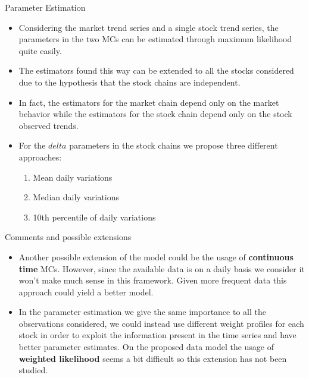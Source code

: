 \documentclass{beamer}
\begin{document}
	\begin{frame}{Parameter Estimation}
	\begin{itemize}
		\item Considering the market trend series and a single stock trend series, the parameters in the two MCs can be estimated through maximum likelihood quite easily.
		\item The estimators found this way can be extended to all the stocks considered due to the hypothesis that the stock chains are independent.
		\item In fact, the estimators for the market chain depend only on the market behavior while the estimators for the stock chain depend only on the stock observed trends.
		\item For the $delta$ parameters in the stock chains we propose three different approaches:
			\begin{enumerate}
				\item Mean daily variations
				\item Median daily variations
				\item 10th percentile of daily variations
			\end{enumerate}
	\end{itemize}
	\end{frame}

	\begin{frame}{Comments and possible extensions}
	\begin{itemize}
		\item Another possible extension of the model could be the usage of \textbf{continuous time} MCs. However, since the available data is on a daily basis we consider it won't make
			  much sense in this framework. Given more frequent data this approach could yield a better model.
		\item In the parameter estimation we give the same importance to all the observations considered, we could instead use different weight profiles for each stock in order to 
			  exploit the information present in the time series and have better parameter estimates. On the proposed data model the usage of \textbf{weighted likelihood} seems a bit difficult
			  so this extension has not been studied.
	\end{itemize}
	\end{frame}
\end{document}
